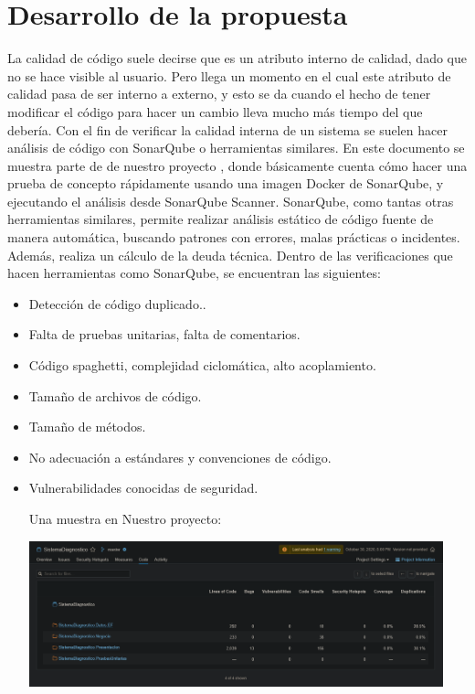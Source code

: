 \documentclass[preprint,12pt]{elsarticle}
\begin{document}
\section{Desarrollo de la propuesta}
La calidad de código suele decirse que es un atributo interno de calidad, dado que no se hace visible al usuario. Pero llega un momento en el cual este atributo de calidad pasa de ser interno a externo, y esto se da cuando el hecho de tener modificar el código para hacer un cambio lleva mucho más tiempo del que debería. Con el fin de verificar la calidad interna de un sistema se suelen hacer análisis de código con SonarQube o herramientas similares. En este documento se muestra parte de de nuestro proyecto , donde básicamente  cuenta cómo hacer una prueba de concepto rápidamente usando una imagen Docker de SonarQube, y ejecutando el análisis desde SonarQube Scanner.
SonarQube, como tantas otras herramientas similares, permite realizar análisis estático de código fuente de manera automática, buscando patrones con errores, malas prácticas o incidentes. Además, realiza un cálculo de la deuda técnica. Dentro de las verificaciones que hacen herramientas como SonarQube, se encuentran las siguientes:
\begin{itemize}
	\item Detección de código duplicado..
	\item Falta de pruebas unitarias, falta de comentarios. 
	\item Código spaghetti, complejidad ciclomática, alto acoplamiento.
	\item Tamaño de archivos de código.
	\item Tamaño de métodos.
	\item No adecuación a estándares y convenciones de código.
	\item Vulnerabilidades conocidas de seguridad.
	
	Una muestra en Nuestro proyecto:
		
\begin{center}
	\includegraphics[width=12cm]{./imagen/Screenshot_2020-10-30 Code.png} 
	\end{center}
\end{itemize}
\end{document}
